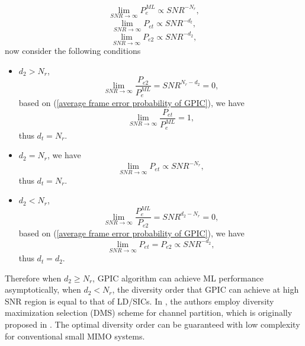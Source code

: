 \documentclass[12pt, draftclsnofoot, onecolumn]{IEEEtran}
\begin{document}
\begin{equation}
\lim_{SNR\to\infty}P^{ML}_{e}\propto SNR^{-N_{r}},
\label{MLD diversity}
\end{equation}
\begin{equation}
\lim_{SNR\to\infty}P_{et}\propto SNR^{-d_{t}},
\label{GPIC diversity}
\end{equation}
\begin{equation}
\lim_{SNR\to\infty}P_{e2}\propto SNR^{-d_{2}},
\label{LD diversity}
\end{equation}
 now consider the following conditions
\begin{itemize}
\item $d_{2}>N_{r}$,
\begin{equation}
\lim_{SNR\to\infty}\frac{P_{e2}}{P^{ML}_{e}}=SNR^{N_{r}-d_{2}}=0,
\label{condition1sub1}
\end{equation}
based on (\ref{average frame error probability of GPIC}), we have
\begin{equation}
\lim_{SNR\to\infty}\frac{P_{et}}{P^{ML}_{e}}=1,
\label{condition1sub2}
\end{equation}
thus $d_{t}=N_{r}$.
\item $d_2=N_{r}$,
we have 
\begin{equation}
\lim_{SNR\to\infty}P_{et}\propto SNR^{-N_{r}},
\label{condition2sub1}
\end{equation}
thus $d_{t}=N_{r}$.
\item $d_{2}<N_{r}$,
\begin{equation}
\lim_{SNR\to\infty}\frac{P^{ML}_{e}}{P_{e2}}=SNR^{d_{2}-N_{r}}=0,
\label{condition3sub1}
\end{equation}
based on (\ref{average frame error probability of GPIC}), we have  
\begin{equation}
\lim_{SNR\to\infty}P_{et}=P_{e2}\propto SNR^{-d_{2}},
\label{condition3sub2}
\end{equation}
thus 
$d_{t}=d_{2}$.
\end{itemize} 
Therefore when $d_{2}\geq N_{r}$, GPIC algorithm can achieve ML performance asymptotically, when $d_{2}<N_{r}$, the diversity order that GPIC can achieve at high SNR region is equal to that of LD/SICs. In \cite{radji2009interference}, the authors employ diversity maximization selection (DMS) scheme for channel partition, which is originally proposed in \cite{zhang2006diversity}. The optimal diversity order can be guaranteed with low complexity for conventional small MIMO systems.
\end{document}
